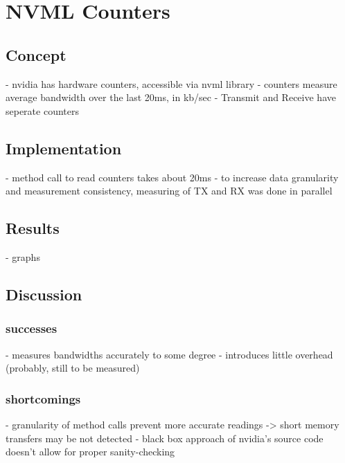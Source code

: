
\chapter{NVML Counters}\label{chapter:nvml}

\section{Concept}
- nvidia has hardware counters, accessible via nvml library
- counters measure average bandwidth over the last 20ms, in kb/sec
- Transmit and Receive have seperate counters

\section{Implementation}
- method call to read counters takes about 20ms
- to increase data granularity and measurement consistency, measuring of TX and RX was done in parallel



\section{Results}

- graphs

\section{Discussion}

\subsection{successes}

- measures bandwidths accurately to some degree
- introduces little overhead (probably, still to be measured)


\subsection{shortcomings}
- granularity of method calls prevent more accurate readings -> short memory transfers may be not detected
- black box approach of nvidia's source code doesn't allow for proper sanity-checking